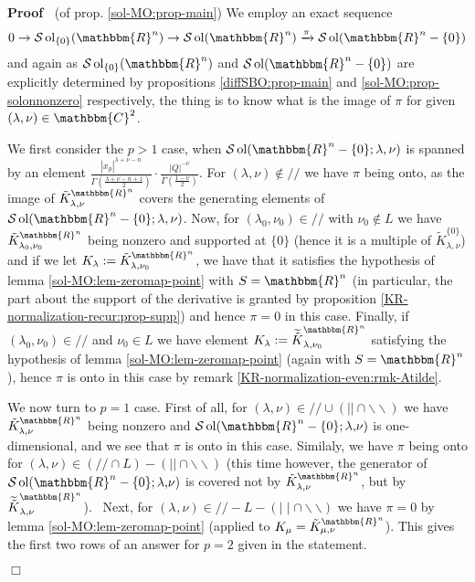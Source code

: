 \documentclass{article}
\newcommand{\assign}{:=}
\newcommand{\comma}{{,}}
\newcommand{\nin}{\not\in}
\newcommand{\tmop}[1]{\ensuremath{\operatorname{#1}}}
\newcommand{\um}{-}
\newenvironment{proof}{\noindent\textbf{Proof\ }}{\hspace*{\fill}$\Box$\medskip}
\numberwithin{definition}{section}
\numberwithin{lemma}{section}
\numberwithin{proposition}{section}
{\theorembodyfont{\rmfamily}\newtheorem{remark}{Remark}
\numberwithin{remark}{section}
}
\begin{document}
\begin{proof}
  (of prop. \ref{sol-MO:prop-main}) We employ an exact sequence
  \[ 0 \rightarrow \mathcal{S} \tmop{ol}_{\{ 0 \}} ( \mathbbm{R}^n)
     \rightarrow \mathcal{S} \tmop{ol} ( \mathbbm{R}^n) \xrightarrow{\pi}
     \mathcal{S} \tmop{ol} ( \mathbbm{R}^n \um \{ 0 \}) \]
  and again as $\mathcal{S} \tmop{ol}_{\{ 0 \}} ( \mathbbm{R}^n)$ and
  $\mathcal{S} \tmop{ol} ( \mathbbm{R}^n \um \{ 0 \})$ are explicitly
  determined by propositions \ref{diffSBO:prop-main} and
  \ref{sol-MO:prop-solonnonzero} respectively, the thing is to know what is
  the image of $\pi$ for given $( \lambda, \nu) \in \mathbbm{C}^2$.
  
  We first consider the $p > 1$ case, when $\mathcal{S} \tmop{ol} (
  \mathbbm{R}^n - \{ 0 \} ; \lambda, \nu)$ is spanned by an element $\frac{|
  x_p |^{\lambda + \nu - n}}{\Gamma \left( \frac{\lambda + \nu - n + 1}{2}
  \right)} \cdot \frac{| Q |^{- \nu}}{\Gamma \left( \frac{1 - \nu}{2}
  \right)}$. For $( \lambda, \nu) \nin / /$ we have $\pi$ being onto, as the
  image of $\tilde{K}_{\lambda, \nu}^{\mathbbm{R}^n}$ covers the generating
  elements of $\mathcal{S} \tmop{ol} ( \mathbbm{R}^n - \{ 0 \} ; \lambda,
  \nu)$. Now, for $( \lambda_0, \nu_0) \in / /$ with $\nu_0 \nin L$ we have
  $\tilde{K}_{\lambda_0, \nu_0}^{\mathbbm{R}^n}$ being nonzero and supported
  at $\{ 0 \}$ (hence it is a multiple of $\tilde{K}_{\lambda, \nu}^{\{ 0
  \}}$) and if we let $K_{\lambda} \assign \tilde{K}_{\lambda,
  \nu_0}^{\mathbbm{R}^n}$, we have that it satisfies the hypothesis of lemma
  \ref{sol-MO:lem-zeromap-point} with $S =\mathbbm{R}^n$ (in particular, the
  part about the support of the derivative is granted by proposition
  \ref{KR-normalization-recur:prop-supp}) and hence $\pi = 0$ in this case.
  Finally, if $( \lambda_0, \nu_0) \in / /$ and $\nu_0 \in L$ we have element
  $K_{\lambda} \assign \widetilde{\tilde{K}}_{\lambda, \nu_0}^{\mathbbm{R}^n}$
  satisfying the hypothesis of lemma \ref{sol-MO:lem-zeromap-point} (again
  with $S =\mathbbm{R}^n$), hence $\pi$ is onto in this case by remark
  \ref{KR-normalization-even:rmk-Atilde}.
  
  We now turn to $p = 1$ case. First of all, for $( \lambda, \nu) \in / / \cup
  ( | | \cap \backslash\backslash)$ we have $\tilde{K}_{\lambda,
  \nu}^{\mathbbm{R}^n}$ being nonzero and $\mathcal{S} \tmop{ol} (
  \mathbbm{R}^n - \{ 0 \} ; \lambda \comma \nu)$ is one-dimensional, and we
  see that $\pi$ is onto in this case. Similaly, we have $\pi$ being onto for
  $( \lambda, \nu) \in ( / / \cap L) - ( | | \cap \backslash\backslash)$ (this
  time however, the generator of $\mathcal{S} \tmop{ol} ( \mathbbm{R}^n - \{ 0
  \} ; \lambda \comma \nu)$ is covered not by $\tilde{K}_{\lambda,
  \nu}^{\mathbbm{R}^n}$, but by $\widetilde{\tilde{K}}_{\lambda,
  \nu}^{\mathbbm{R}^n}$). \ Next, for $( \lambda_{}, \nu) \in / / - L - ( \mid
  \mid \cap \backslash\backslash)$ we have $\pi = 0$ by lemma
  \ref{sol-MO:lem-zeromap-point} (applied to $K_{\mu} = \tilde{K}_{\mu,
  \nu}^{\mathbbm{R}^n}$). This gives the first two rows of an answer for $p =
  2$ given in the statement.
  

\end{proof}
\end{document}
